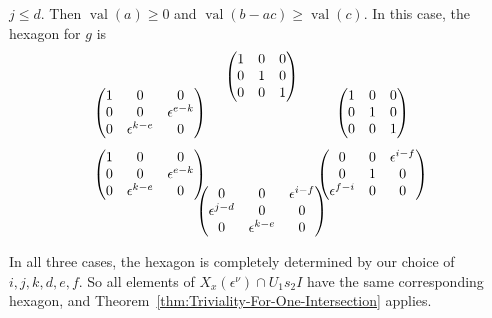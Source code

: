\documentclass{amsart}
\theoremstyle{definition}
\def\e{\epsilon}
\def\val{\mathop{\mathrm{val}}}
\def\en{\e^{\nu}}
\def\X{X_x(\en)}
\def\heximages#1#2#3#4#5#6{
  \heximagessqueezedcarefully{1.7em}{-1em}{#1}{#2}{#3}{#4}{#5}{#6}
}
\def\heximagessqueezedcarefully#1#2#3#4#5#6#7#8{
  \begin{array}{ccc}
    & #3 & \\[#2]
    #5 \hspace{-#1} & & \hspace{-#1} #4 \\[2em]
    #6 \hspace{-#1} & & \hspace{-#1} #7 \\[#2]
    & #8 &
  \end{array}
}
\newenvironment{caselist}
	       {\begin{list}{\underline{Case \arabic{enumi}}:}
		   {\usecounter{enumi}
		     \setlength{\itemindent}{0.5in}
		     \setlength{\leftmargin}{0in}
		     \setlength{\rightmargin}{0in}
	       }}
	       {\end{list}}
\begin{document}
\begin{caselist}
    \item $j \le d$.  Then $\val(a) \ge 0$ and $\val(b-ac) \ge \val(c)$.  In
      this case, the hexagon for $g$ is
      \begin{equation*}
	\heximages
	    {\begin{pmatrix}
		1 & 0 & 0 \\
		0 & 1 & 0 \\
		0 & 0 & 1
	    \end{pmatrix}}
	    {\begin{pmatrix}
		1 & 0 & 0 \\
		0 & 1 & 0 \\
		0 & 0 & 1
	    \end{pmatrix}}
	    {\begin{pmatrix}
		1 & 0 & 0 \\
		0 & 0 & \e^{e-k} \\
		0 & \e^{k-e} & 0
	    \end{pmatrix}}
	    {\begin{pmatrix}
		1 & 0 & 0 \\
		0 & 0 & \e^{e-k} \\
		0 & \e^{k-e} & 0
	    \end{pmatrix}}
	    {\begin{pmatrix}
		0 & 0 & \e^{i-f} \\
		0 & 1 & 0  \\
		\e^{f-i} & 0 & 0
	    \end{pmatrix}}
	    {\begin{pmatrix}
		0 & 0 & \e^{i-f} \\
		\e^{j-d} & 0 & 0  \\
		0 & \e^{k-e} & 0
	    \end{pmatrix}}
      \end{equation*}
  \end{caselist}
  In all three cases, the hexagon is completely determined by our choice of
  $i,j,k,d,e,f$.  So all elements of $\X \cap U_1 s_2 I$ have the same
  corresponding hexagon, and Theorem~\ref{thm:Triviality-For-One-Intersection}
  applies.
    
\end{document}

